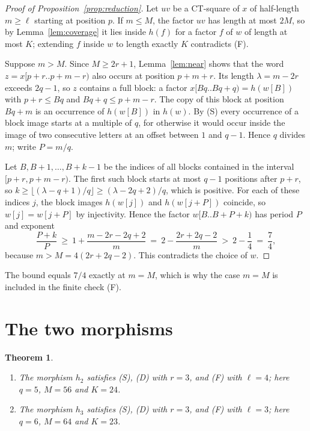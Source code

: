 \documentclass[11pt]{amsart}
\newtheorem{theorem}{Theorem}[section]
\theoremstyle{definition}
\theoremstyle{remark}
\begin{document}
\begin{proof}[Proof of Proposition~\ref{prop:reduction}]
Let $uv$ be a CT-square of $x$ of half-length $m\ge\ell$ starting at position $p$. If $m\le M$, the factor $uv$ has length at most $2M$, so by Lemma~\ref{lem:coverage} it lies inside $h(f)$ for a factor $f$ of $w$ of length at most $K$; extending $f$ inside $w$ to length exactly $K$ contradicts (F).

Suppose $m>M$. Since $M\ge 2r+1$, Lemma~\ref{lem:near} shows that the word $z=x[p+r..p+m-r)$ also occurs at position $p+m+r$. Its length $\lambda=m-2r$ exceeds $2q-1$, so $z$ contains a full block: a factor $x[Bq..Bq+q)=h(w[B])$ with $p+r\le Bq$ and $Bq+q\le p+m-r$. The copy of this block at position $Bq+m$ is an occurrence of $h(w[B])$ in $h(w)$. By (S) every occurrence of a block image starts at a multiple of $q$, for otherwise it would occur inside the image of two consecutive letters at an offset between $1$ and $q-1$. Hence $q$ divides $m$; write $P=m/q$.

Let $B,B+1,\dots,B+k-1$ be the indices of all blocks contained in the interval $[p+r,p+m-r)$. The first such block starts at most $q-1$ positions after $p+r$, so $k\ge\lfloor(\lambda-q+1)/q\rfloor\ge(\lambda-2q+2)/q$, which is positive. For each of these indices $j$, the block images $h(w[j])$ and $h(w[j+P])$ coincide, so $w[j]=w[j+P]$ by injectivity. Hence the factor $w[B..B+P+k)$ has period $P$ and exponent
\[
\frac{P+k}{P}\ \ge\ 1+\frac{m-2r-2q+2}{m}\ =\ 2-\frac{2r+2q-2}{m}\ >\ 2-\frac14\ =\ \frac74,
\]
because $m>M=4(2r+2q-2)$. This contradicts the choice of $w$.
\end{proof}

The bound equals $7/4$ exactly at $m=M$, which is why the case $m=M$ is included in the finite check (F).

\section{The two morphisms}\label{sec:computation}

\begin{theorem}\label{thm:computation}
\begin{enumerate}
\item The morphism $h_2$ satisfies (S), (D) with $r=3$, and (F) with $\ell=4$; here $q=5$, $M=56$ and $K=24$.
\item The morphism $h_3$ satisfies (S), (D) with $r=3$, and (F) with $\ell=3$; here $q=6$, $M=64$ and $K=23$.
\end{enumerate}
\end{theorem}
\end{document}
